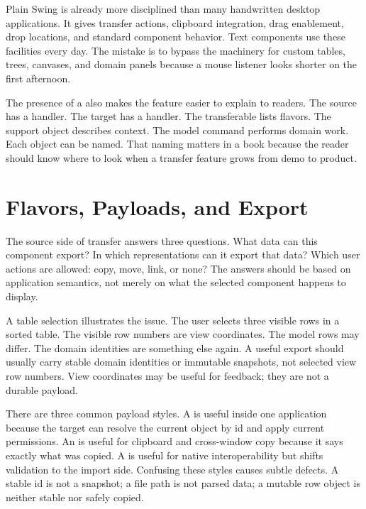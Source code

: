 Plain Swing is already more disciplined than many handwritten desktop applications. It gives transfer actions, clipboard integration, drag enablement, drop locations, and standard component behavior. Text components use these facilities every day. The mistake is to bypass the machinery for custom tables, trees, canvases, and domain panels because a mouse listener looks shorter on the first afternoon.

The presence of a  also makes the feature easier to explain to readers. The source has a handler. The target has a handler. The transferable lists flavors. The support object describes context. The model command performs domain work. Each object can be named. That naming matters in a book because the reader should know where to look when a transfer feature grows from demo to product.

\section{Flavors, Payloads, and Export}

The source side of transfer answers three questions. What data can this component export? In which representations can it export that data? Which user actions are allowed: copy, move, link, or none? The answers should be based on application semantics, not merely on what the selected component happens to display.

A table selection illustrates the issue. The user selects three visible rows in a sorted table. The visible row numbers are view coordinates. The model rows may differ. The domain identities are something else again. A useful export should usually carry stable domain identities or immutable snapshots, not selected view row numbers. View coordinates may be useful for feedback; they are not a durable payload.

There are three common payload styles. A  is useful inside one application because the target can resolve the current object by id and apply current permissions. An  is useful for clipboard and cross-window copy because it says exactly what was copied. A  is useful for native interoperability but shifts validation to the import side. Confusing these styles causes subtle defects. A stable id is not a snapshot; a file path is not parsed data; a mutable row object is neither stable nor safely copied.

